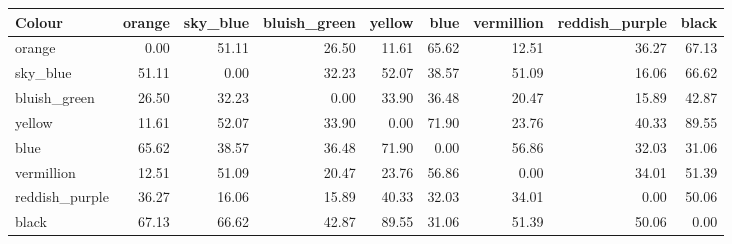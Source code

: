 \begin{tabular}{lrrrrrrrr}
\toprule
Colour & orange & sky\_blue & bluish\_green & yellow & blue & vermillion & reddish\_purple & black \\
\midrule
orange & 0.00 & 51.11 & 26.50 & 11.61 & 65.62 & 12.51 & 36.27 & 67.13 \\
sky\_blue & 51.11 & 0.00 & 32.23 & 52.07 & 38.57 & 51.09 & 16.06 & 66.62 \\
bluish\_green & 26.50 & 32.23 & 0.00 & 33.90 & 36.48 & 20.47 & 15.89 & 42.87 \\
yellow & 11.61 & 52.07 & 33.90 & 0.00 & 71.90 & 23.76 & 40.33 & 89.55 \\
blue & 65.62 & 38.57 & 36.48 & 71.90 & 0.00 & 56.86 & 32.03 & 31.06 \\
vermillion & 12.51 & 51.09 & 20.47 & 23.76 & 56.86 & 0.00 & 34.01 & 51.39 \\
reddish\_purple & 36.27 & 16.06 & 15.89 & 40.33 & 32.03 & 34.01 & 0.00 & 50.06 \\
black & 67.13 & 66.62 & 42.87 & 89.55 & 31.06 & 51.39 & 50.06 & 0.00 \\
\bottomrule
\end{tabular}
